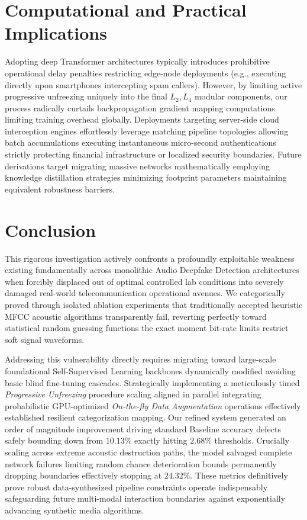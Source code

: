 \documentclass[10pt, twocolumn]{article}
\begin{document}
\section{Computational and Practical Implications}
Adopting deep Transformer architectures typically introduces prohibitive operational delay penalties restricting edge-node deployments (e.g., executing directly upon smartphones intercepting spam callers). However, by limiting active progressive unfreezing uniquely into the final $L_2, L_4$ modular components, our process radically curtails backpropagation gradient mapping computations limiting training overhead globally. Deployments targeting server-side cloud interception engines effortlessly leverage matching pipeline topologies allowing batch accumulations executing instantaneous micro-second authentications strictly protecting financial infrastructure or localized security boundaries. Future derivations target migrating massive networks mathematically employing knowledge distillation strategies minimizing footprint parameters maintaining equivalent robustness barriers.


\section{Conclusion}

This rigorous investigation actively confronts a profoundly exploitable weakness existing fundamentally across monolithic Audio Deepfake Detection architectures when forcibly displaced out of optimal controlled lab conditions into severely damaged real-world telecommunication operational avenues. We categorically proved through isolated ablation experiments that traditionally accepted heuristic MFCC acoustic algorithms transparently fail, reverting perfectly toward statistical random guessing functions the exact moment bit-rate limits restrict soft signal waveforms.

Addressing this vulnerability directly requires migrating toward large-scale foundational Self-Supervised Learning backbones dynamically modified avoiding basic blind fine-tuning cascades. Strategically implementing a meticulously timed \textit{Progressive Unfreezing} procedure scaling aligned in parallel integrating probabilistic GPU-optimized \textit{On-the-fly Data Augmentation} operations effectively established resilient categorization mapping. Our refined system generated an order of magnitude improvement driving standard Baseline accuracy defects safely bounding down from $10.13\%$ exactly hitting $2.68\%$ thresholds. Crucially scaling across extreme acoustic destruction paths, the model salvaged complete network failures limiting random chance deterioration bounds permanently dropping boundaries effectively stopping at $24.32\%$. These metrics definitively prove robust data-synthesized pipeline constraints operate indispensably safeguarding future multi-modal interaction boundaries against exponentially advancing synthetic media algorithms.
\end{document}
